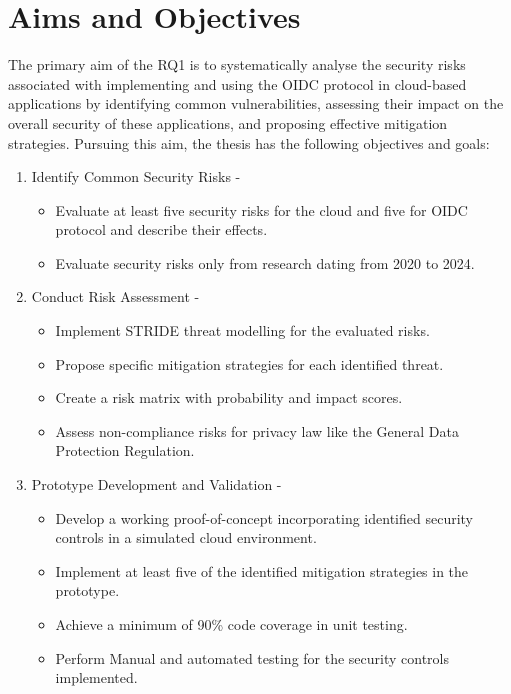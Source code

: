 \section{Aims and Objectives}
The primary aim of the RQ1 is to systematically analyse the security risks associated with implementing and using the OIDC protocol in cloud-based applications by identifying common vulnerabilities, assessing their impact on the overall security of these applications, and proposing effective mitigation strategies.
Pursuing this aim, the thesis has the following objectives and goals:

\begin{enumerate}
  \item Identify Common Security Risks - 
  \begin{itemize}
      \item Evaluate at least five security risks for the cloud and five for OIDC protocol and describe their effects.
      \item Evaluate security risks only from research dating from 2020 to 2024.
  \end{itemize}

    
  \item Conduct Risk Assessment  - 
  \begin{itemize}
      \item Implement STRIDE threat modelling for the evaluated risks.
      \item Propose specific mitigation strategies for each identified threat.
      \item Create a risk matrix with probability and impact scores.
      \item Assess non-compliance risks for privacy law like the General Data Protection Regulation. 
  \end{itemize}
  \item Prototype Development and Validation - 
  \begin{itemize}
      \item Develop a working proof-of-concept incorporating identified security controls in a simulated cloud environment.
      \item Implement at least five of the identified mitigation strategies in the prototype.
      \item Achieve a minimum of 90\% code coverage in unit testing.
      \item Perform Manual and automated testing for the security controls implemented.
  \end{itemize}
\end{enumerate}

